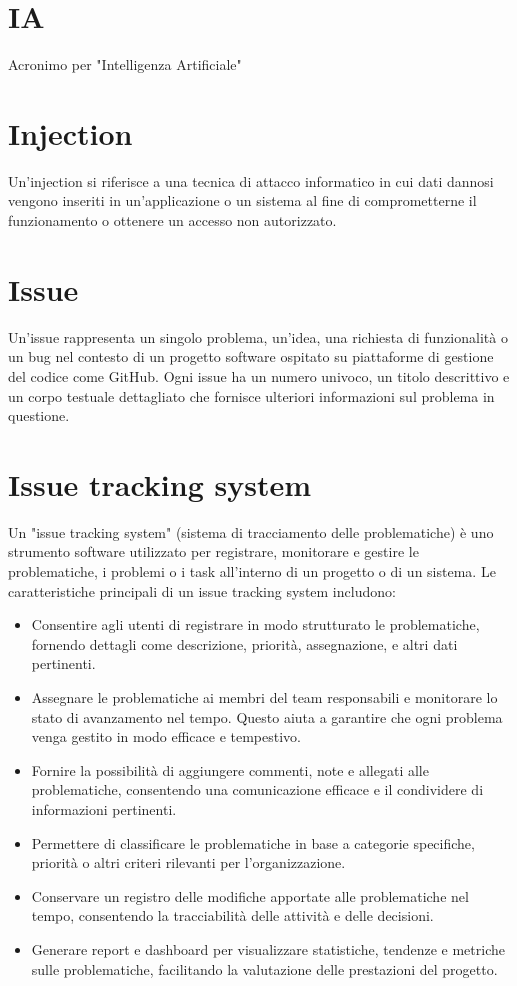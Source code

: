 \documentclass{article}
\begin{document}
\section{IA}
Acronimo per "Intelligenza Artificiale"

\section{Injection}
Un'injection si riferisce a una tecnica di attacco informatico in cui dati dannosi vengono inseriti in un'applicazione o un sistema al fine di comprometterne il funzionamento o ottenere un accesso non autorizzato.

\section{Issue}
Un'issue rappresenta un singolo problema, un'idea, una richiesta di funzionalità o un bug nel contesto di un progetto software ospitato su piattaforme di gestione del codice come GitHub. Ogni issue ha un numero univoco, un titolo descrittivo e un corpo testuale dettagliato che fornisce ulteriori informazioni sul problema in questione.

\section{Issue tracking system}
Un "issue tracking system" (sistema di tracciamento delle problematiche) è uno strumento software utilizzato per registrare, monitorare e gestire le problematiche, i problemi o i task all'interno di un progetto o di un sistema. Le caratteristiche principali di un issue tracking system includono:
\begin{itemize}
    \item Consentire agli utenti di registrare in modo strutturato le problematiche, fornendo dettagli come descrizione, priorità, assegnazione, e altri dati pertinenti.
    \item Assegnare le problematiche ai membri del team responsabili e monitorare lo stato di avanzamento nel tempo. Questo aiuta a garantire che ogni problema venga gestito in modo efficace e tempestivo.
    \item Fornire la possibilità di aggiungere commenti, note e allegati alle problematiche, consentendo una comunicazione efficace e il condividere di informazioni pertinenti.
    \item Permettere di classificare le problematiche in base a categorie specifiche, priorità o altri criteri rilevanti per l'organizzazione.
    \item Conservare un registro delle modifiche apportate alle problematiche nel tempo, consentendo la tracciabilità delle attività e delle decisioni.
    \item Generare report e dashboard per visualizzare statistiche, tendenze e metriche sulle problematiche, facilitando la valutazione delle prestazioni del progetto.
\end{itemize}
\end{document}
